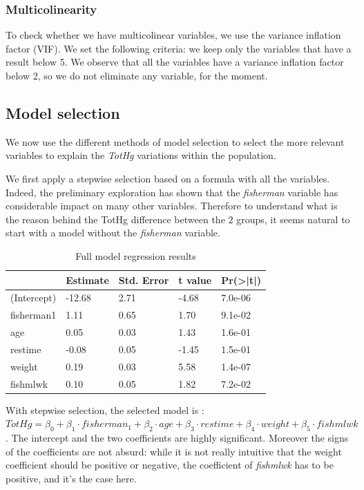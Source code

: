 \documentclass[12pt,]{article}
\begin{document}
\subsubsection{Multicolinearity}\label{multicolinearity}

To check whether we have multicolinear variables, we use the variance
inflation factor (VIF). We set the following criteria: we keep only the
variables that have a result below 5. We observe that all the variables
have a variance inflation factor below 2, so we do not eliminate any
variable, for the moment.

\subsection{Model selection}\label{model-selection}

We now use the different methods of model selection to select the more
relevant variables to explain the \emph{TotHg} variations within the
population.

We first apply a stepwise selection based on a formula with all the
variables. Indeed, the preliminary exploration has shown that the
\emph{fisherman} variable has considerable impact on many other
variables. Therefore to understand what is the reason behind the TotHg
difference between the 2 groups, it seems natural to start with a model
without the \emph{fisherman} variable.

\begin{table}[t]

\caption{\label{tab:unnamed-chunk-12}Full model regression results}
\centering
\begin{tabular}{l|l|l|l|l}
\hline
  & Estimate & Std. Error & t value & Pr(>|t|)\\
\hline
\rowcolor{gray!6}  (Intercept) & -12.68 & 2.71 & -4.68 & 7.0e-06\\
\hline
fisherman1 & 1.11 & 0.65 & 1.70 & 9.1e-02\\
\hline
\rowcolor{gray!6}  age & 0.05 & 0.03 & 1.43 & 1.6e-01\\
\hline
restime & -0.08 & 0.05 & -1.45 & 1.5e-01\\
\hline
\rowcolor{gray!6}  weight & 0.19 & 0.03 & 5.58 & 1.4e-07\\
\hline
fishmlwk & 0.10 & 0.05 & 1.82 & 7.2e-02\\
\hline
\end{tabular}
\end{table}

With stepwise selection, the selected model is :
\(TotHg = \beta_0 + \beta_1 \cdot fisherman_1 + \beta_2 \cdot age + \beta_3 \cdot restime + \beta_4 \cdot weight + \beta_5 \cdot fishmlwk\).
The intercept and the two coefficients are highly significant. Moreover
the signs of the coefficients are not absurd: while it is not really
intuitive that the weight coefficient should be positive or negative,
the coefficient of \emph{fishmlwk} has to be positive, and it's the case
here.
\end{document}
